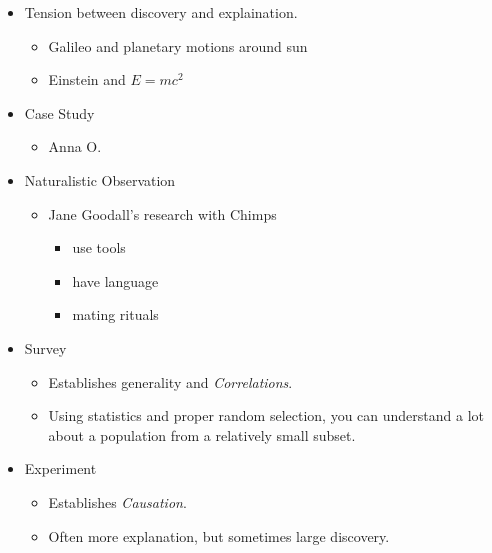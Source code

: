 \documentclass[12pt]{article}
\begin{document}
\begin{itemize}
    \item Tension between discovery and explaination.
        \begin{itemize}
            \item Galileo and planetary motions around sun
            \item Einstein and $E = mc^2$
        \end{itemize}
    \item Case Study
        \begin{itemize}
            \item Anna O.
        \end{itemize}
    \item Naturalistic Observation
        \begin{itemize}
            \item Jane Goodall's research with Chimps
                \begin{itemize}
                    \item use tools
                    \item have language
                    \item mating rituals
                \end{itemize}
        \end{itemize}
    \item Survey
        \begin{itemize}
            \item Establishes generality and \textit{Correlations}.
            \item Using statistics and proper random selection, you can
                understand a lot about a population from a relatively small
                subset.
        \end{itemize}
    \item Experiment
        \begin{itemize}
            \item Establishes \textit{Causation}.
            \item Often more explanation, but sometimes large discovery.
        \end{itemize}
\end{itemize}
\end{document}
